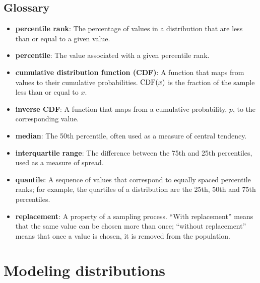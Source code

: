 \documentclass[12pt]{book}
\begin{document}
\section{Glossary}

\begin{itemize}

\item {\bf percentile rank}: The percentage of values in a distribution that are
less than or equal to a given value.

\item {\bf percentile}: The value associated with a given percentile rank.

\item {\bf cumulative distribution function (CDF)}: A function that maps
  from values to their cumulative probabilities.  $\mathrm{CDF}(x)$ is the
  fraction of the sample less than or equal to $x$.  

\item {\bf inverse CDF}: A function that maps from a cumulative probability,
  $p$, to the corresponding value.

\item {\bf median}: The 50th percentile, often used as a measure of central
  tendency.  

\item {\bf interquartile range}: The difference between
the 75th and 25th percentiles, used as a measure of spread.

\item {\bf quantile}: A sequence of values that correspond to equally spaced
percentile ranks; for example, the quartiles of a distribution are
the 25th, 50th and 75th percentiles.

\item {\bf replacement}: A property of a sampling process. ``With replacement''
means that the same value can be chosen more than once; ``without
replacement'' means that once a value is chosen, it is removed from
the population.

\end{itemize}


\chapter{Modeling distributions}
\label{modeling}
\end{document}
